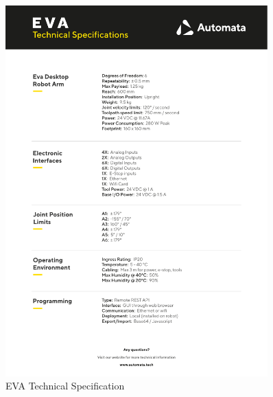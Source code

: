 \newpage

\newpage
\begin{figure}[H]
	\centering
	\includegraphics[page=2, width=0.9\textwidth]{appendices/evaSpecSheet.pdf}
	\caption{EVA Technical Specification \cite{evaSpec}}
\end{figure}